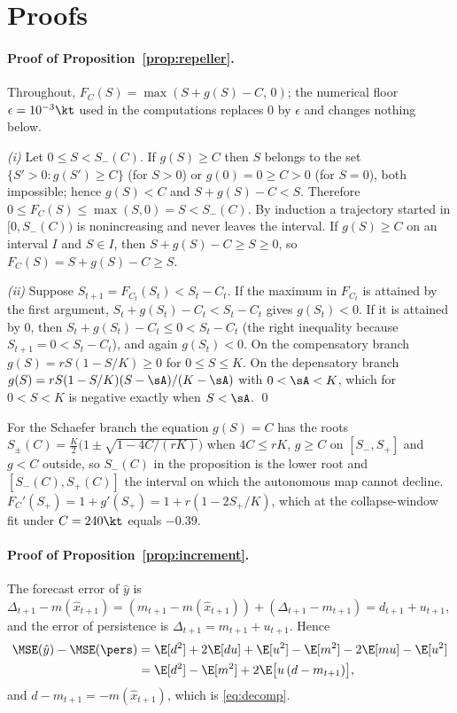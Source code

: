\appendix
\FloatBarrier
\section{Proofs}\label{app:proofs}

\paragraph{Proof of Proposition~\ref{prop:repeller}.} Throughout, $F_C(S) = \max(S + g(S) - C,\,0)$; the numerical floor $\epsilon = 10^{-3}\kt$ used in the computations replaces $0$ by $\epsilon$ and changes nothing below.

\emph{(i)} Let $0 \le S < S_-(C)$. If $g(S) \ge C$ then $S$ belongs to the set $\{S'>0 : g(S')\ge C\}$ (for $S>0$) or $g(0)=0\ge C>0$ (for $S=0$), both impossible; hence $g(S) < C$ and $S + g(S) - C < S$. Therefore $0 \le F_C(S) \le \max(S,0) = S < S_-(C)$. By induction a trajectory started in $[0,S_-(C))$ is nonincreasing and never leaves the interval. If $g(S) \ge C$ on an interval $I$ and $S\in I$, then $S + g(S) - C \ge S \ge 0$, so $F_C(S) = S + g(S) - C \ge S$.

\emph{(ii)} Suppose $S_{t+1} = F_{C_t}(S_t) < S_t - C_t$. If the maximum in $F_{C_t}$ is attained by the first argument, $S_t + g(S_t) - C_t < S_t - C_t$ gives $g(S_t) < 0$. If it is attained by $0$, then $S_t + g(S_t) - C_t \le 0 < S_t - C_t$ (the right inequality because $S_{t+1} = 0 < S_t - C_t$), and again $g(S_t) < 0$. On the compensatory branch $g(S) = rS(1-S/K) \ge 0$ for $0 \le S \le K$. On the depensatory branch $g(S) = rS(1-S/K)(S-\sA)/(K-\sA)$ with $0<\sA<K$, which for $0<S<K$ is negative exactly when $S<\sA$. \qed

For the Schaefer branch the equation $g(S)=C$ has the roots $S_\pm(C) = \tfrac{K}{2}\bigl(1\pm\sqrt{1-4C/(rK)}\bigr)$ when $4C\le rK$, $g\ge C$ on $[S_-,S_+]$ and $g<C$ outside, so $S_-(C)$ in the proposition is the lower root and $[S_-(C),S_+(C)]$ the interval on which the autonomous map cannot decline. $F_C'(S_+) = 1 + g'(S_+) = 1 + r(1-2S_+/K)$, which at the collapse-window fit under $C=240\kt$ equals $-0.39$.

\paragraph{Proof of Proposition~\ref{prop:increment}.} The forecast error of $\hat y$ is $\Delta_{t+1}-m(\hat x_{t+1}) = (m_{t+1}-m(\hat x_{t+1})) + (\Delta_{t+1}-m_{t+1}) = d_{t+1}+u_{t+1}$, and the error of persistence is $\Delta_{t+1} = m_{t+1}+u_{t+1}$. Hence
\begin{align*}
\MSE(\hat y)-\MSE(\pers) &= \E[d^2]+2\E[du]+\E[u^2] - \E[m^2]-2\E[mu]-\E[u^2]\\
&= \E[d^2]-\E[m^2] + 2\E\bigl[u\,(d-m_{t+1})\bigr],
\end{align*}
and $d-m_{t+1} = -m(\hat x_{t+1})$, which is \eqref{eq:decomp}.

